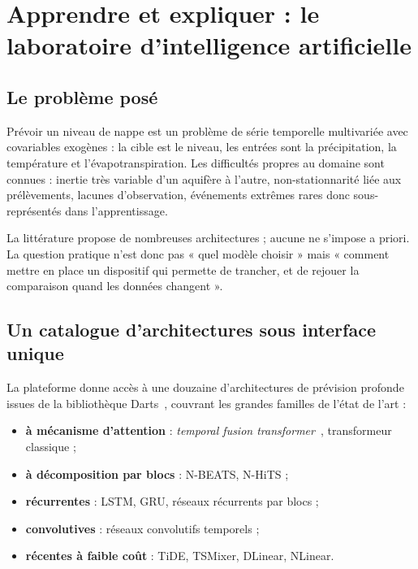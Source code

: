 \chapter{Apprendre et expliquer : le laboratoire d'intelligence artificielle}
\label{ch:apprentissage}


\section{Le problème posé}

Prévoir un niveau de nappe est un problème de série temporelle multivariée avec covariables
exogènes : la cible est le niveau, les entrées sont la précipitation, la température et
l'évapotranspiration. Les difficultés propres au domaine sont connues : inertie très variable
d'un aquifère à l'autre, non-stationnarité liée aux prélèvements, lacunes d'observation,
événements extrêmes rares donc sous-représentés dans l'apprentissage.

La littérature propose de nombreuses architectures ; aucune ne s'impose a priori. La question
pratique n'est donc pas « quel modèle choisir » mais « comment mettre en place un dispositif
qui permette de trancher, et de rejouer la comparaison quand les données changent ».

\section{Un catalogue d'architectures sous interface unique}

La plateforme donne accès à une douzaine d'architectures de prévision profonde issues de la
bibliothèque Darts~\cite{darts}, couvrant les grandes familles de l'état de l'art :

\begin{itemize}
  \item \textbf{à mécanisme d'attention} : \emph{temporal fusion transformer}~\cite{lim2021tft},
  transformeur classique ;
  \item \textbf{à décomposition par blocs} : N-BEATS, N-HiTS ;
  \item \textbf{récurrentes} : LSTM, GRU, réseaux récurrents par blocs ;
  \item \textbf{convolutives} : réseaux convolutifs temporels ;
  \item \textbf{récentes à faible coût} : TiDE, TSMixer, DLinear, NLinear.
\end{itemize}

